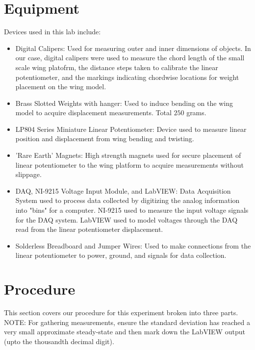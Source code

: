 \documentclass{article}
\begin{document}
\section{Equipment}
Devices used in this lab include:
\begin{itemize}

\item Digital Calipers: Used for measuring outer and inner dimensions of objects. In our case, digital calipers were used to measure the chord length of the small scale wing platofrm, the distance steps taken to calibrate the linear potentiometer, and the markings indicating chordwise locations for weight placement on the wing model.
\vspace{2.5mm}

\item Brass Slotted Weights with hanger: Used to induce bending on the wing model to acquire displacement measurements. Total $250$ grams.
\vspace{2.5mm}

\item LP804 Series Miniature Linear Potentiometer: Device used to measure linear position and displacement from wing bending and twisting.
\vspace{2.5mm}

\item 'Rare Earth' Magnets: High strength magnets used for secure placement of linear potentiometer to the wing platform to acquire measurements without slippage.
\vspace{2.5mm}

\item DAQ, NI-9215 Voltage Input Module, and LabVIEW: Data Acquisition System used to process data collected by digitizing the analog information into "bins" for a computer. NI-9215 used to measure the input voltage signals for the DAQ system. LabVIEW used to model voltages through the DAQ read from the linear potentiometer displacement.
\vspace{2.5mm}

\item Solderless Breadboard and Jumper Wires: Used to make connections from the linear potentiometer to power, ground, and signals for data collection.

\end{itemize}

\section{Procedure}
This section covers our procedure for this experiment broken into three parts. NOTE: For gathering measurements, ensure the standard deviation has reached a very small approximate steady-state and then mark down the LabVIEW output (upto the thousandth decimal digit).
\end{document}
